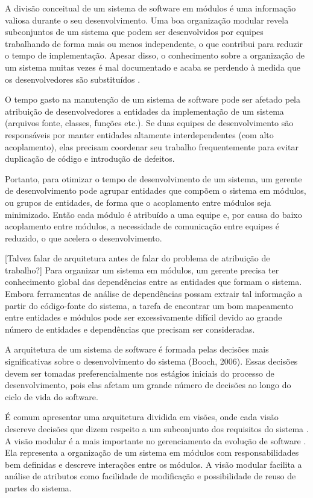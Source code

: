 % 

A divisão conceitual de um sistema de software em módulos é uma informação valiosa durante o seu desenvolvimento. Uma boa organização modular revela subconjuntos de um sistema que podem ser desenvolvidos por equipes trabalhando de forma mais ou menos independente, o que contribui para reduzir o tempo de implementação. Apesar disso, o conhecimento sobre a organização de um sistema muitas vezes é mal documentado e acaba se perdendo à medida que os desenvolvedores são substituídos \cite{Clements2002}.

O tempo gasto na manutenção de um sistema de software pode ser afetado pela atribuição de desenvolvedores a entidades da implementação de um sistema (arquivos fonte, classes, funções etc.). Se duas equipes de desenvolvimento são responsáveis por manter entidades altamente interdependentes (com alto acoplamento), elas precisam coordenar seu trabalho frequentemente para evitar duplicação de código e introdução de defeitos.

Portanto, para otimizar o tempo de desenvolvimento de um sistema, um gerente de desenvolvimento pode agrupar entidades que compõem o sistema em módulos, ou grupos de entidades, de forma que o acoplamento entre módulos seja minimizado. Então cada módulo é atribuído a uma equipe e, por causa do baixo acoplamento entre módulos, a necessidade de comunicação entre equipes é reduzido, o que acelera o desenvolvimento.

[Talvez falar de arquitetura antes de falar do problema de atribuição de trabalho?]
Para organizar um sistema em módulos, um gerente precisa ter conhecimento global das dependências entre as entidades que formam o sistema. Embora ferramentas de análise de dependências possam extrair tal informação a partir do código-fonte do sistema, a tarefa de encontrar um bom mapeamento entre entidades e módulos pode ser excessivamente difícil devido ao grande número de entidades e dependências que precisam ser consideradas.


A arquitetura de um sistema de software é formada pelas decisões mais significativas sobre o desenvolvimento do sistema (Booch, 2006). Essas decisões devem ser tomadas preferencialmente nos estágios iniciais do processo de desenvolvimento, pois elas afetam um grande número de decisões ao longo do ciclo de vida do software.

É comum apresentar uma arquitetura dividida em visões, onde cada visão descreve decisões que dizem respeito a um subconjunto dos requisitos do sistema \cite{Clements2002}. A visão modular é a mais importante no gerenciamento da evolução de software \cite{Parnas1972}. Ela representa a organização de um sistema em módulos com responsabilidades bem definidas e descreve interações entre os módulos. A visão modular facilita a análise de atributos como facilidade de modificação e possibilidade de reuso de partes do sistema.

